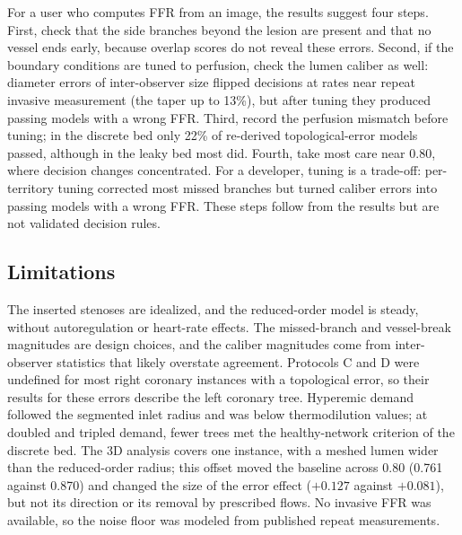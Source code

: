\documentclass[journal,twoside,web]{ieeecolor}
\begin{document}
For a user who computes FFR from an image, the results suggest four steps. First, check that the side branches
beyond the lesion are present and that no vessel ends early, because overlap scores do not reveal these errors.
Second, if the boundary conditions are tuned to perfusion, check the lumen caliber as well: diameter errors of
inter-observer size flipped decisions at rates near repeat invasive measurement (the taper up to 13\%), but after
tuning they produced passing models with a wrong FFR. Third, record the perfusion mismatch before tuning; in the discrete bed
only 22\% of re-derived topological-error models passed, although in the leaky bed most did. Fourth, take most care near 0.80,
where decision changes concentrated. For a developer, tuning is a trade-off: per-territory tuning corrected most
missed branches but turned caliber errors into passing models with a wrong FFR. These steps follow from the results
but are not validated decision rules.

\subsection{Limitations}
The inserted stenoses are idealized, and the reduced-order model is steady, without autoregulation or heart-rate
effects. The missed-branch and vessel-break magnitudes are design choices, and the caliber magnitudes come from
inter-observer statistics that likely overstate agreement. Protocols C and D were undefined for most right coronary
instances with a topological error, so their results for these errors describe the left coronary tree. Hyperemic
demand followed the segmented inlet radius and was below thermodilution values; at doubled and tripled demand,
fewer trees met the healthy-network criterion of the discrete bed. The 3D analysis covers one instance, with a
meshed lumen wider than the reduced-order radius; this offset moved the baseline
across 0.80 (0.761 against 0.870) and changed the size of the error effect ($+0.127$ against $+0.081$), but not its
direction or its removal by prescribed flows. No invasive FFR was available, so the noise floor was modeled from published repeat
measurements.
\end{document}
